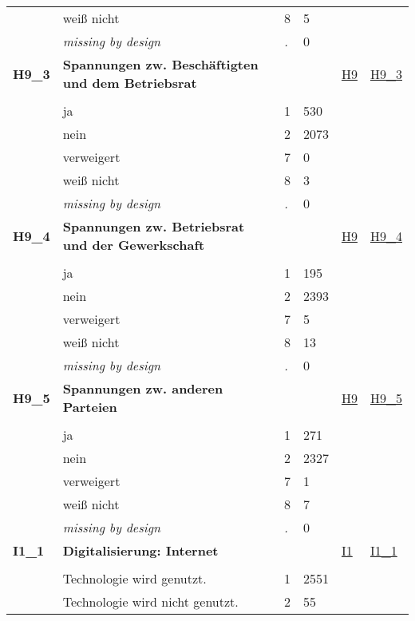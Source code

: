 \begin{longtable}{| L{2.45cm} | L{6cm} | C{1.5cm} | R{1cm} | C{2.25cm} | C{2.25cm} |}
   & weiß nicht & 8 & 5 &  &  \\ 
   & \textit{missing by design} & \textit{.} & 0 &  &  \\ 
   \midrule
\textbf{H9\_3}\label{var:H9:3} & \textbf{Spannungen zw. Beschäftigten und dem Betriebsrat} &  &  & \hyperref[H9]{H9} & \hyperref[var:suf:H9:3]{H9\_3} \\ 
   &  &  &  &  &  \\ 
   & ja & 1 & 530 &  &  \\ 
   & nein & 2 & 2073 &  &  \\ 
   & verweigert & 7 & 0 &  &  \\ 
   & weiß nicht & 8 & 3 &  &  \\ 
   & \textit{missing by design} & \textit{.} & 0 &  &  \\ 
   \midrule
\textbf{H9\_4}\label{var:H9:4} & \textbf{Spannungen zw. Betriebsrat und der Gewerkschaft} &  &  & \hyperref[H9]{H9} & \hyperref[var:suf:H9:4]{H9\_4} \\ 
   &  &  &  &  &  \\ 
   & ja & 1 & 195 &  &  \\ 
   & nein & 2 & 2393 &  &  \\ 
   & verweigert & 7 & 5 &  &  \\ 
   & weiß nicht & 8 & 13 &  &  \\ 
   & \textit{missing by design} & \textit{.} & 0 &  &  \\ 
   \midrule
\textbf{H9\_5}\label{var:H9:5} & \textbf{Spannungen zw. anderen Parteien} &  &  & \hyperref[H9]{H9} & \hyperref[var:suf:H9:5]{H9\_5} \\ 
   &  &  &  &  &  \\ 
   & ja & 1 & 271 &  &  \\ 
   & nein & 2 & 2327 &  &  \\ 
   & verweigert & 7 & 1 &  &  \\ 
   & weiß nicht & 8 & 7 &  &  \\ 
   & \textit{missing by design} & \textit{.} & 0 &  &  \\ 
   \midrule
\textbf{I1\_1}\label{var:I1:1} & \textbf{Digitalisierung: Internet} &  &  & \hyperref[I1]{I1} & \hyperref[var:suf:I1:1]{I1\_1} \\ 
   &  &  &  &  &  \\ 
   & Technologie wird genutzt. & 1 & 2551 &  &  \\ 
   & Technologie wird nicht genutzt. & 2 & 55 &  &  \\ 

\end{longtable}
